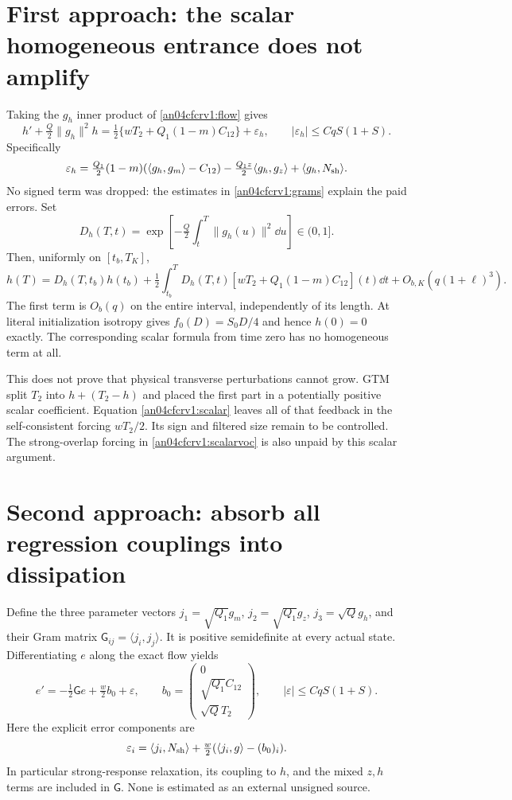 \documentclass[11pt]{article}
\begin{document}
\section{First approach: the scalar homogeneous entrance does not amplify}
Taking the $g_h$ inner product of \eqref{an04cfcrv1:flow} gives
\begin{equation}\label{an04cfcrv1:scalar}
 h'+\tfrac Q2\|g_h\|^2h
 =\tfrac12\{wT_2+Q_1(1-m)C_{12}\}+\varepsilon_h,
 \qquad |\varepsilon_h|\le CqS(1+S).
\end{equation}
Specifically
\[
 \varepsilon_h=\tfrac{Q_1}{2}(1-m)
      (\langle g_h,g_m\rangle-C_{12})
 -\tfrac{Q_1z}{2}\langle g_h,g_z\rangle
 +\langle g_h,N_{\rm sh}\rangle.
\]
No signed term was dropped: the estimates in
\eqref{an04cfcrv1:grams} explain the paid errors.
Set
\[
 D_h(T,t)=\exp\left[-\tfrac Q2\int_t^T\|g_h(u)\|^2\dd u\right]
 \in(0,1].
\]
Then, uniformly on $[t_b,T_K]$,
\begin{equation}\label{an04cfcrv1:scalarvoc}
 h(T)=D_h(T,t_b)h(t_b)
 +\tfrac12\int_{t_b}^TD_h(T,t)
       [wT_2+Q_1(1-m)C_{12}](t)\dd t+O_{b,K}(q(1+\ell)^3).
\end{equation}
The first term is $O_b(q)$ on the entire interval, independently
of its length. At literal initialization isotropy gives
$f_0(D)=S_0D/4$ and hence $h(0)=0$ exactly. The corresponding
scalar formula from time zero has no homogeneous term at all.

This does not prove that physical transverse perturbations cannot
grow. GTM split $T_2$ into $h+(T_2-h)$ and placed the first part
in a potentially positive scalar coefficient. Equation
\eqref{an04cfcrv1:scalar} leaves all of that feedback in the
self-consistent forcing $wT_2/2$. Its sign and filtered size remain
to be controlled. The strong-overlap forcing in
\eqref{an04cfcrv1:scalarvoc} is also unpaid by this scalar argument.

\section{Second approach: absorb all regression couplings into dissipation}
Define the three parameter vectors
$j_1=\sqrt{Q_1}g_m$, $j_2=\sqrt{Q_1}g_z$,
$j_3=\sqrt Qg_h$, and their Gram matrix
$\mathsf G_{ij}=\langle j_i,j_j\rangle$.
It is positive semidefinite at every actual state. Differentiating
$e$ along the exact flow yields
\begin{equation}\label{an04cfcrv1:vector}
 e'=-\tfrac12\mathsf G e+\tfrac w2 b_0+\varepsilon,
 \qquad
 b_0=\begin{pmatrix}0\\\sqrt{Q_1}C_{12}\\\sqrt Q T_2\end{pmatrix},
 \qquad |\varepsilon|\le CqS(1+S).
\end{equation}
Here the explicit error components are
\[
 \varepsilon_i=\langle j_i,N_{\rm sh}\rangle
       +\tfrac w2(\langle j_i,g\rangle-(b_0)_i).
\]
In particular strong-response relaxation, its coupling to $h$,
and the mixed $z,h$ terms are included in $\mathsf G$.
None is estimated as an external unsigned source.
\end{document}
